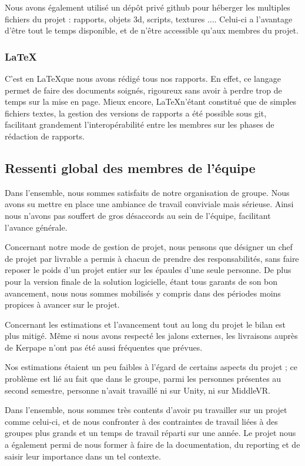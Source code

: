 Nous avons également utilisé un dépôt privé github pour héberger les multiples fichiers du projet : rapports, objets 3d, scripts, textures ....
Celui-ci a l'avantage d'être tout le temps disponible, et de n'être accessible qu'aux membres du projet.

\subsubsection{\LaTeX}

C'est en \LaTeX que nous avons rédigé tous nos rapports.
En effet, ce langage permet de faire des documents soignés, rigoureux sans avoir à perdre trop de temps sur la mise en page.
Mieux encore, \LaTeX n'étant constitué que de simples fichiers textes, la gestion des versions de rapports a été possible sous git, facilitant grandement l'interopérabilité entre les membres sur les phases de rédaction de rapports.

\subsection{Ressenti global des membres de l'équipe}

Dans l'ensemble, nous sommes satisfaits de notre organisation de groupe. 
Nous avons su mettre en place une ambiance de travail conviviale mais sérieuse. 
Ainsi nous n'avons pas souffert de gros désaccords au sein de l'équipe, facilitant l'avance générale.

Concernant notre mode de gestion de projet, nous pensons que désigner un chef de projet par livrable a permis à chacun de prendre des responsabilités, sans faire reposer le poids d'un projet entier sur les épaules d'une seule personne.
De plus pour la version finale de la solution logicielle, étant tous garants de son bon avancement, nous nous sommes mobilisés y compris dans des périodes moins propices à avancer sur le projet.

Concernant les estimations et l'avancement tout au long du projet le bilan est plus mitigé.
Même si nous avons respecté les jalons externes, les livraisons auprès de Kerpape n'ont pas été aussi fréquentes que prévues.
 
Nos estimations étaient un peu faibles à l'égard de certains aspects du projet ; ce problème est lié au fait que dans le groupe, parmi les personnes présentes au second semestre, personne n'avait travaillé ni sur Unity, ni sur MiddleVR.

Dans l'ensemble, nous sommes très contents d'avoir pu travailler sur un projet comme celui-ci, et de nous confronter à des contraintes de travail liées à des groupes plus grands et un temps de travail réparti sur une année.
Le projet nous a également permi de nous former à faire de la documentation, du reporting et de saisir leur importance dans un tel contexte. 